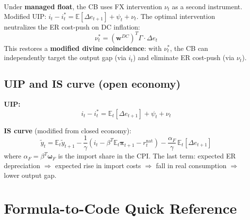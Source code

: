 \documentclass[11pt]{article}
\begin{document}
Under \textbf{managed float}, the CB uses FX intervention $\nu_t$ as a second instrument.
Modified UIP: $i_t - i^*_t = \mathbb{E}[\Delta e_{t+1}] + \psi_t + \nu_t$.
The optimal intervention neutralizes the ER cost-push on DC inflation:
\[
  \nu_t^* = (\mathbf{w}^{DC})^T\Gamma \cdot \Delta e_t
\]
This restores a \textbf{modified divine coincidence}: with $\nu_t^*$, the CB can
independently target the output gap (via $i_t$) and eliminate ER cost-push (via $\nu_t$).

\subsection{UIP and IS curve (open economy)}

\textbf{UIP:}
\[
  i_t - i^*_t = \mathbb{E}_t[\Delta e_{t+1}] + \psi_t + \nu_t
\]

\textbf{IS curve} (modified from closed economy):
\[
  \tilde{y}_t = \mathbb{E}_t\tilde{y}_{t+1} - \frac{1}{\gamma}(i_t - \beta^T\mathbb{E}_t\boldsymbol\pi_{t+1} - r^{\text{nat}}_t)
    - \frac{\alpha_F}{\gamma}\,\mathbb{E}_t[\Delta e_{t+1}]
\]
where $\alpha_F = \beta^T\boldsymbol\omega_F$ is the import share in the CPI.
The last term: expected ER depreciation $\Rightarrow$ expected rise in import costs
$\Rightarrow$ fall in real consumption $\Rightarrow$ lower output gap.

\section{Formula-to-Code Quick Reference}
\end{document}
